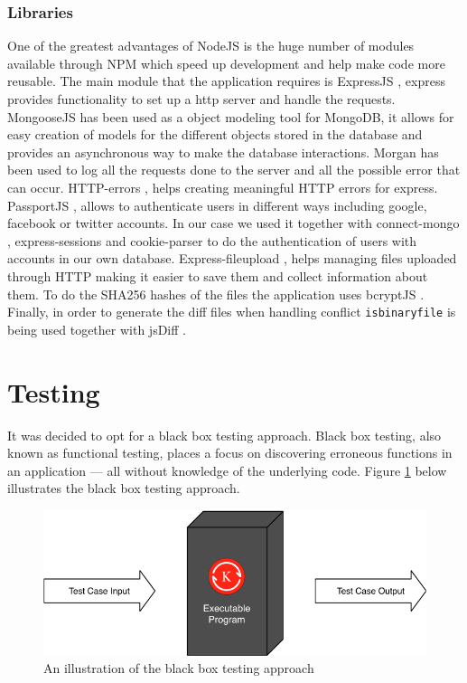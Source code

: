 \documentclass[11pt]{article}
\begin{document}
\subsubsection*{Libraries}

One of the greatest advantages of NodeJS is the huge number of modules available through NPM which speed up development and help make code more reusable. 
The main module that the application requires is ExpressJS \cite{expressjs:19}, express provides functionality to set up a http server and handle the requests.
MongooseJS \cite{mongoosejs:19} has been used as a object modeling tool for MongoDB, it allows for easy creation of models for the different objects stored in the database and provides an asynchronous way to make the database interactions.
Morgan \cite{morgan:19} has been used to log all the requests done to the server and all the possible error that can occur.
HTTP-errors \cite{http-errors:19}, helps creating meaningful HTTP errors for express.
PassportJS \cite{passportjs:19}, allows to authenticate users in different ways including google, facebook or twitter accounts. In our case we used it together with connect-mongo \cite{connect-mongo:19}, express-sessions \cite{express-sessions:19} and cookie-parser \cite{cookie-parser:19} to do the authentication of users with accounts in our own database.
Express-fileupload \cite{express-fileupload:19}, helps managing files uploaded through HTTP making it easier to save them and collect information about them.
To do the SHA256 hashes of the files the application uses bcryptJS \cite{bcryptjs:19}.
Finally, in order to generate the diff files when handling conflict {\tt isbinaryfile} \cite{isbinaryfile:19} is being used together with jsDiff \cite{jsdiff:19}.


\section{Testing}

It was decided to opt for a black box testing \cite{blackboxtesting:19} approach. Black box testing, also known as functional testing, places a focus on discovering erroneous functions in an application --- all without knowledge of the underlying code. Figure \ref{fig:black-box} below illustrates the black box testing approach.

\begin{figure}[H]
	\centering
	\includegraphics[scale=1.0]{graphics/black-box.pdf}
	\caption{An illustration of the black box testing approach}
	\label{fig:black-box}
\end{figure}
\end{document}
